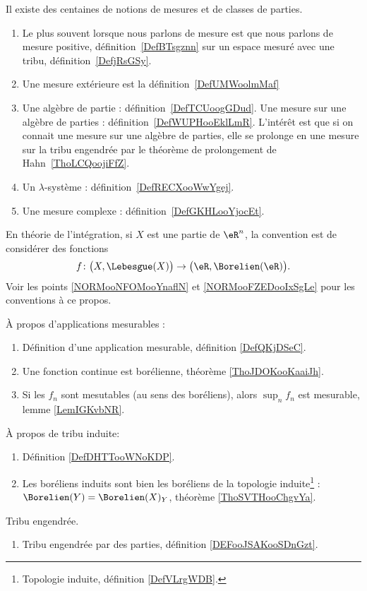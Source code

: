   \label{INTooVDSCooHXLLKp}
Il existe des centaines de notions de mesures et de classes de parties.
\begin{enumerate}
	\item
	      Le plus souvent lorsque nous parlons de mesure est que nous parlons de mesure positive, définition~\ref{DefBTsgznn} sur un espace mesuré avec une tribu, définition~\ref{DefjRsGSy}.
	\item
	      Une mesure extérieure est la définition~\ref{DefUMWoolmMaf}
	\item
	      Une algèbre de partie : définition~\ref{DefTCUoogGDud}. Une mesure sur une algèbre de parties : définition~\ref{DefWUPHooEklLmR}. L'intérêt est que si on connait une mesure sur une algèbre de parties, elle se prolonge en une mesure sur la tribu engendrée par le théorème de prolongement de Hahn~\ref{ThoLCQoojiFfZ}.
	\item
	      Un \( \lambda\)-système : définition~\ref{DefRECXooWwYgej}.
	\item
	      Une mesure complexe : définition~\ref{DefGKHLooYjocEt}.
\end{enumerate}

En théorie de l'intégration, si \( X\) est une partie de \( \eR^n\), la convention est de considérer des fonctions
\[
	f\colon \big( X,\Lebesgue(X) \big)\to \big( \eR,\Borelien(\eR) \big).
\]
Voir les points \ref{NORMooNFOMooYnaflN} et \ref{NORMooFZEDooIxSgLe} pour les conventions à ce propos.

À propos d'applications mesurables :
\begin{enumerate}
	\item
	      Définition d'une application mesurable, définition \ref{DefQKjDSeC}.
	\item
	      Une fonction continue est borélienne, théorème \ref{ThoJDOKooKaaiJh}.
	\item
	      Si les \( f_n\) sont mesutables (au sens des boréliens), alors \( \sup_nf_n\) est mesurable, lemme \ref{LemIGKvbNR}.
\end{enumerate}


À propos de tribu induite:
\begin{enumerate}
	\item
	      Définition \ref{DefDHTTooWNoKDP}.
	\item
	      Les boréliens induits sont bien les boréliens de la topologie induite\footnote{Topologie induite, définition \ref{DefVLrgWDB}.} : \( \Borelien(Y)=\Borelien(X)_Y\), théorème \ref{ThoSVTHooChgvYa}.
\end{enumerate}

Tribu engendrée.
\begin{enumerate}
	\item
	      Tribu engendrée par des parties, définition \ref{DEFooJSAKooSDnGzt}.
\end{enumerate}
